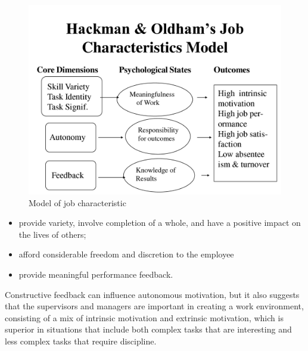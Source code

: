 \begin{figure}
\centering
\includegraphics[width=\textwidth]{Grafik/Hackman}
\caption{Model of job characteristic \cite{HACKMAN}}
\label{Hackman}
\end{figure}

\begin{itemize}
\item provide variety, involve completion of a whole, and have a positive impact on the lives of others;
\item afford considerable freedom and discretion to the employee
\item provide meaningful performance feedback.
\end{itemize}

Constructive feedback can influence autonomous motivation, but it also suggests that the supervisors and managers are important in creating a work environment, consisting of a mix of intrinsic motivation and extrinsic motivation, which is superior in situations that include both complex tasks that are interesting and less complex tasks that require discipline. 
